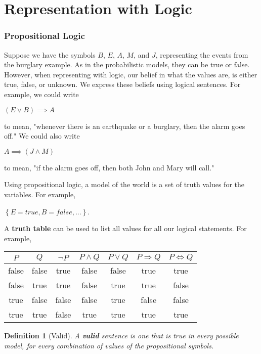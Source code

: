 \documentclass[10pt,a4paper]{article}
\newtheorem{defin}{Definition}
\begin{document}
\part{Representation with Logic}

\section{Propositional Logic}

Suppose we have the symbols $B$, $E$, $A$, $M$, and $J$, representing the events from the burglary example. As in the probabilistic models, they can be true or false. However, when representing with logic, our belief in what the values are, is either true, false, or unknown. We express these beliefs using logical sentences. For example, we could write
\begin{center}
$(E\lor B)\implies A$
\end{center}
to mean, "whenever there is an earthquake or a burglary, then the alarm goes off." We could also write
\begin{center}
$A \implies (J\land M)$
\end{center}
to mean, "if the alarm goes off, then both John and Mary will call."

Using propositional logic, a model of the world is a set of truth values for the variables. For example,
\begin{center}
$\left\{E = true, B = false, ...\right\}$.
\end{center}
A \textbf{truth table} can be used to list all values for all our logical statements. For example,
\begin{center}
\begin{tabular}{| c | c || c | c | c | c | c |}
\hline
$P$ & $Q$ &  $\neg P$ & $P\land Q$ & $P\lor Q$ & $P\Rightarrow Q$ & $P\Leftrightarrow Q$\\
\hline
false & false & true & false & false & true & true \\
false & true & true & false & true & true & false \\
true & false & false & false & true & false & false \\
true & true & false & true & true & true & true \\
\hline
\end{tabular}
\end{center}

\begin{defin}[Valid]
A \emph{\textbf{valid}} sentence is one that is true in every possible model, for every combination of values of the propositional symbols.
\end{defin}
\end{document}
